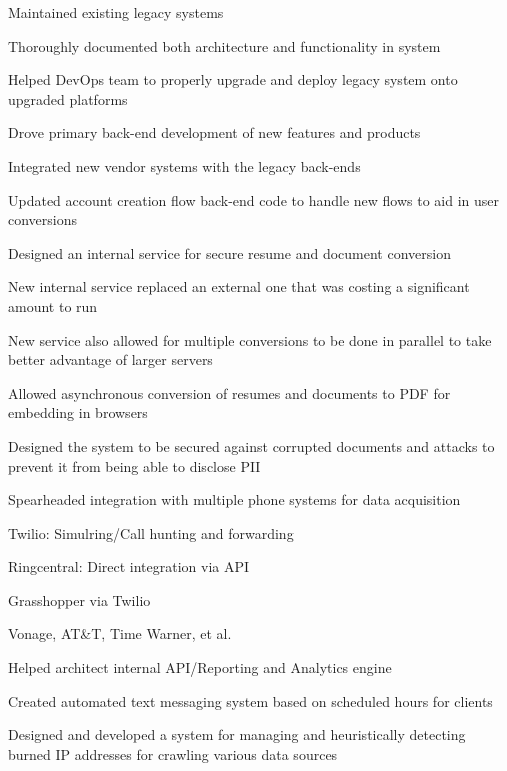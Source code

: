 \documentclass[table,tmargin=1in,bmargin=1in,letterpaper]{resume}
\begin{document}
\begin{compactitem}
\item Maintained existing legacy systems
  \begin{compactitem}
  \item Thoroughly documented both architecture and functionality in system
  \item Helped DevOps team to properly upgrade and deploy legacy system onto upgraded platforms
  \end{compactitem}
\item Drove primary back-end development of new features and products
\item Integrated new vendor systems with the legacy back-ends
\end{compactitem}

\begin{compactitem}
\item Updated account creation flow back-end code to handle new flows to aid in user conversions
\item Designed an internal service for secure resume and document conversion
  \begin{compactitem}
  \item New internal service replaced an external one that was costing a significant amount to run
  \item New service also allowed for multiple conversions to be done in parallel to take better advantage of larger servers
  \item Allowed asynchronous conversion of resumes and documents to PDF for embedding in browsers
  \item Designed the system to be secured against corrupted documents and attacks to prevent it from being able to disclose PII
  \end{compactitem}
\end{compactitem}

\begin{compactitem}
\item Spearheaded integration with multiple phone systems for data acquisition
  \begin{compactitem}
  \item Twilio: Simulring/Call hunting and forwarding
  \item Ringcentral: Direct integration via API
  \item Grasshopper via Twilio
  \item Vonage, AT\&T, Time Warner, et al.
  \end{compactitem}
\item Helped architect internal API/Reporting and Analytics engine
\item Created automated text messaging system based on scheduled hours for clients
\item Designed and developed a system for managing and heuristically detecting burned IP addresses for crawling various data sources 
\end{compactitem}
\end{document}
